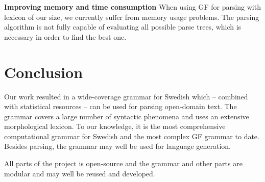 \documentclass[runningheads,a4paper]{llncs}
\begin{document}

%


\textbf{Improving memory and time consumption}
When using GF for parsing with lexicon of our size, we currently
suffer from memory usage problems. The parsing algorithm is not fully
capable of evaluating all possible parse trees, which is necessary in order
to find the best one.




\section{Conclusion}
Our work resulted in a wide-coverage grammar for Swedish which --
combined with statistical resources -- can be used for parsing 
open-domain text. The grammar covers a large number of syntactic 
phenomena and uses an extensive morphological lexicon. To
our knowledge, it is the most comprehensive computational grammar for
Swedish and the most complex GF grammar to date.
Besides parsing, the grammar may well be used for language generation.

All parts of the project is open-source and the grammar and other parts
are modular and may well be reused and developed.



\end{document}
